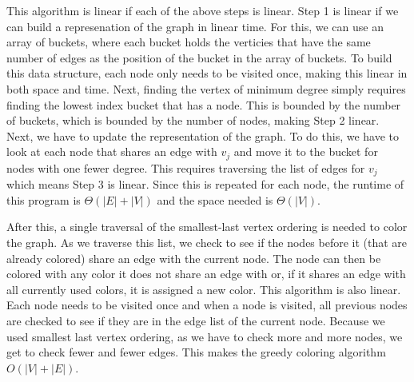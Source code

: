 \documentclass{article}
\begin{document}
        This algorithm is linear if each of the above steps is linear. Step 1 is linear if we can build a represenation of the graph in linear time. For this, we can use an array of buckets, where each bucket holds the verticies that have the same number of edges as the position of the bucket in the array of buckets. To build this data structure, each node only needs to be visited once, making this linear in both space and time. Next, finding the vertex of minimum degree simply requires finding the lowest index bucket that has a node. This is bounded by the number of buckets, which is bounded by the number of nodes, making Step 2 linear. Next, we have to update the representation of the graph. To do this, we have to look at each node that shares an edge with $v_j$ and move it to the bucket for nodes with one fewer degree. This requires traversing the list of edges for $v_j$ which means Step 3 is linear. Since this is repeated for each node, the runtime of this program is $\Theta\left(|E| + |V|\right)$ and the space needed is $\Theta(|V|)$.
        \par
        After this, a single traversal of the smallest-last vertex ordering is needed to color the graph. As we traverse this list, we check to see if the nodes before it (that are already colored) share an edge with the current node. The node can then be colored with any color it does not share an edge with or, if it shares an edge with all currently used colors, it is assigned a new color. This algorithm is also linear. Each node needs to be visited once and when a node is visited, all previous nodes are checked to see if they are in the edge list of the current node. Because we used smallest last vertex ordering, as we have to check more and more nodes, we get to check fewer and fewer edges. This makes the greedy coloring algorithm $O(|V| + |E|)$.
\end{document}
